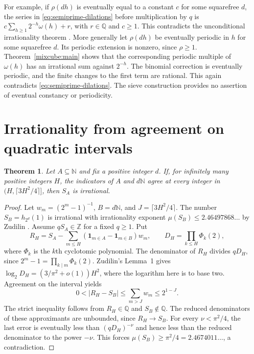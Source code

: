 \documentclass[11pt,letterpaper]{article}
\newtheorem{theorem}{Theorem}[section]
\newcommand{\Z}{\mathbb Z}
\newcommand{\Q}{\mathbb Q}
\newcommand{\N}{\mathbb N}
\newcommand{\ind}{\mathbf 1}
\begin{document}
For example, if $\rho(dh)$ is eventually equal to a constant $c$ for some squarefree $d$, the series in \eqref{eq:semiprime-dilations} before multiplication by $q$ is
$c\sum_{h\ge1}2^{-h}\omega(h)+r$, with $r\in\Q$ and $c\ge1$. This contradicts the unconditional irrationality theorem \cite[Theorem~1.3]{tt}. More generally let $\rho(dh)$ be eventually periodic in $h$ for some squarefree $d$. Its periodic extension is nonzero, since $\rho\ge1$. Theorem~\ref{mixcube:main} shows that the corresponding periodic multiple of $\omega(h)$ has an irrational sum against $2^{-h}$. The binomial correction is eventually periodic, and the finite changes to the first term are rational. This again contradicts \eqref{eq:semiprime-dilations}. The sieve construction provides no assertion of eventual constancy or periodicity.

\section{Irrationality from agreement on quadratic intervals}

\begin{theorem}\label{thm:quadratic-agreement}
Let $A\subseteq\N$ and fix a positive integer $d$. If, for infinitely many positive integers $H$, the indicators of $A$ and $d\N$ agree at every integer in
$(H,\lceil 3H^2/4\rceil]$, then $S_A$ is irrational.
\end{theorem}
\begin{proof}
Let $w_m=(2^m-1)^{-1}$, $B=d\N$, and $J=\lceil 3H^2/4\rceil$.
The number $S_B=h_{2^d}(1)$ is irrational with irrationality exponent
$\mu(S_B)\le 2.46497868\ldots$ by Zudilin \cite[Theorem~1]{zu}. Assume $qS_A\in\Z$ for a fixed $q\ge1$. Put
\[
 R_H=S_A-\sum_{m\le H}(\ind_{m\in A}-\ind_{m\in B})w_m,
 \qquad D_H=\prod_{k\le H}\Phi_k(2),
\]
where $\Phi_k$ is the $k$th cyclotomic polynomial. The denominator of $R_H$ divides $qD_H$, since $2^m-1=\prod_{k\mid m}\Phi_k(2)$. Zudilin's Lemma~1 gives
$\log_2 D_H=(3/\pi^2+o(1))H^2$, where the logarithm here is to base two.
Agreement on the interval yields
\[
 0<|R_H-S_B|\le\sum_{m>J}w_m\le2^{1-J}.
\]
The strict inequality follows from $R_H\in\Q$ and $S_B\notin\Q$. The reduced denominators of these approximants are unbounded, since $R_H\to S_B$. For every $\nu<\pi^2/4$, the last error is eventually less than $(qD_H)^{-\nu}$ and hence less than the reduced denominator to the power $-\nu$. This forces
$\mu(S_B)\ge\pi^2/4=2.4674011\ldots$, a contradiction.
\end{proof}
\end{document}
